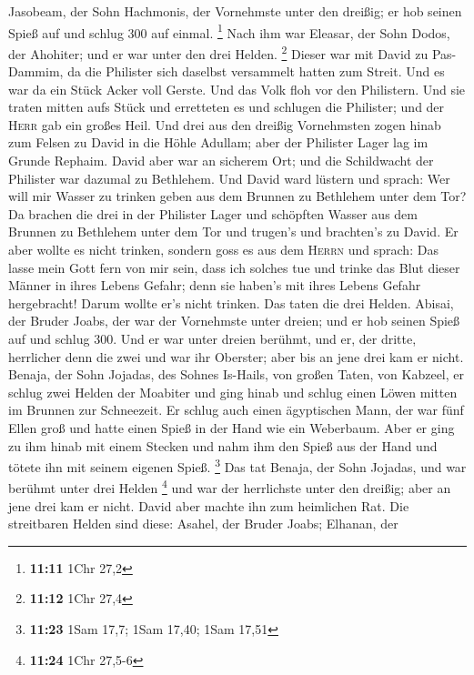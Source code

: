 Jasobeam, der Sohn Hachmonis, der Vornehmste unter den dreißig; er hob
seinen Spieß auf und schlug 300 auf einmal. \footnote{\textbf{11:11}
  1Chr 27,2}  Nach ihm war Eleasar, der Sohn Dodos, der
Ahohiter; und er war unter den drei Helden. \footnote{\textbf{11:12}
  1Chr 27,4}  Dieser war mit David zu Pas-Dammim, da die
Philister sich daselbst versammelt hatten zum Streit. Und es war da ein
Stück Acker voll Gerste. Und das Volk floh vor den Philistern.
 Und sie traten mitten aufs Stück und erretteten es und
schlugen die Philister; und der \textsc{Herr} gab ein großes Heil.
 Und drei aus den dreißig Vornehmsten zogen hinab zum
Felsen zu David in die Höhle Adullam; aber der Philister Lager lag im
Grunde Rephaim.  David aber war an sicherem Ort; und die
Schildwacht der Philister war dazumal zu Bethlehem.  Und
David ward lüstern und sprach: Wer will mir Wasser zu trinken geben aus
dem Brunnen zu Bethlehem unter dem Tor?  Da brachen die
drei in der Philister Lager und schöpften Wasser aus dem Brunnen zu
Bethlehem unter dem Tor und trugen's und brachten's zu David. Er aber
wollte es nicht trinken, sondern goss es aus dem \textsc{Herrn}
 und sprach: Das lasse mein Gott fern von mir sein, dass
ich solches tue und trinke das Blut dieser Männer in ihres Lebens
Gefahr; denn sie haben's mit ihres Lebens Gefahr hergebracht! Darum
wollte er's nicht trinken. Das taten die drei Helden. 
Abisai, der Bruder Joabs, der war der Vornehmste unter dreien; und er
hob seinen Spieß auf und schlug 300. Und er war unter dreien berühmt,
 und er, der dritte, herrlicher denn die zwei und war ihr
Oberster; aber bis an jene drei kam er nicht.  Benaja,
der Sohn Jojadas, des Sohnes Is-Hails, von großen Taten, von Kabzeel, er
schlug zwei Helden der Moabiter und ging hinab und schlug einen Löwen
mitten im Brunnen zur Schneezeit.  Er schlug auch einen
ägyptischen Mann, der war fünf Ellen groß und hatte einen Spieß in der
Hand wie ein Weberbaum. Aber er ging zu ihm hinab mit einem Stecken und
nahm ihm den Spieß aus der Hand und tötete ihn mit seinem eigenen Spieß.
\footnote{\textbf{11:23} 1Sam 17,7; 1Sam 17,40; 1Sam 17,51}
 Das tat Benaja, der Sohn Jojadas, und war berühmt unter
drei Helden \footnote{\textbf{11:24} 1Chr 27,5-6}  und
war der herrlichste unter den dreißig; aber an jene drei kam er nicht.
David aber machte ihn zum heimlichen Rat.  Die
streitbaren Helden sind diese: Asahel, der Bruder Joabs; Elhanan, der
